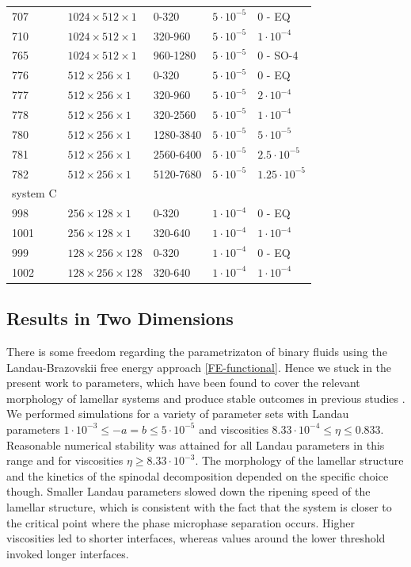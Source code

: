 \documentclass[8.5pt,twoside,twocolumn]{article}
\newcommand{\e}[1]{\cdot10^{#1}}
\begin{document}
\begin{table}[htp!]
\begin{tabular*}{0.495\textwidth}{lllll}
\hline
707 & $1024\times512\times1$ & 0-320 & $5\cdot10^{-5}$ & 0 - EQ \\
710 & $1024\times512\times1$ & 320-960& $5\cdot10^{-5}$ & $1\cdot10^{-4}$ \\
765 & $1024\times512\times1$ & 960-1280& $5\cdot10^{-5}$ & 0 - SO-4 \\
\hline
776 & $512\times256\times1$ & 0-320 & $5\cdot10^{-5}$ & 0 - EQ\\
777 & $512\times256\times1$ & 320-960& $5\cdot10^{-5}$ & $2\cdot 10^{-4}$ \\
778 & $512\times256\times1$ & 320-2560& $5\cdot10^{-5}$ & $1\cdot 10^{-4}$ \\
780 & $512\times256\times1$ & 1280-3840& $5\cdot10^{-5}$ & $5\cdot 10^{-5}$ \\
781 & $512\times256\times1$ & 2560-6400& $5\cdot10^{-5}$ & $2.5\cdot 10^{-5}$ \\
782 & $512\times256\times1$ & 5120-7680& $5\cdot10^{-5}$ & $1.25\cdot 10^{-5}$ \\
\hline
system C & & & &\\
\hline
998 & $256\times128\times1$ & 0-320& $1\cdot10^{-4}$ & 0 - EQ \\
1001 & $256\times128\times1$ & 320-640& $1\cdot10^{-4}$ & $1\cdot10^{-4}$ \\
999 & $128\times256\times128$ & 0-320 & $1\cdot10^{-4}$ & 0 - EQ\\
1002 & $128\times256\times128$ & 320-640 & $1\cdot10^{-4}$ & $1\cdot10^{-4}$\\
\hline
\end{tabular*}
\end{table}

\subsection*{Results in Two Dimensions}
There is some freedom regarding the parametrizaton of binary fluids using the Landau-Brazovskii free energy approach \ref{FE-functional}.
Hence we stuck in the present work to parameters, which have been found to cover the relevant morphology of lamellar systems and produce stable outcomes in previous studies \cite{Kendon01,Xu03, Xu06b}. 
We performed simulations for a variety of parameter sets with Landau parameters $1\cdot10^{-3}\le-a=b\le5\cdot10^{-5}$ and viscosities $8.33\cdot10^{-4}\le\eta\le 0.833$.
Reasonable numerical stability was attained for all Landau parameters in this range and for viscosities $\eta\ge 8.33\e{-3}$.
The morphology of the lamellar structure and the kinetics of the spinodal decomposition depended on the specific choice though.
Smaller Landau parameters slowed down the ripening speed of the lamellar structure, which is consistent with the fact that the system is closer to the critical point where the phase microphase separation occurs.
Higher viscosities led to shorter interfaces, whereas values around the lower threshold invoked longer interfaces.
\end{document}
